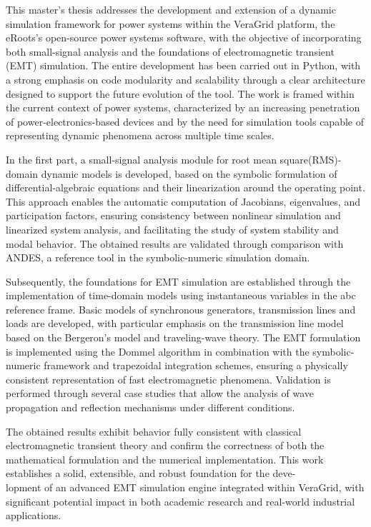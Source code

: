 
This master's thesis addresses the development and extension of a dynamic simulation framework for power systems 
within the VeraGrid platform, the eRoots's open-source power systems software, with the objective of incorporating both small-signal analysis and the foundations of 
electromagnetic transient (EMT) simulation. The entire development has been carried out in Python, with a strong emphasis 
on code modularity and scalability through a clear architecture designed to support the future evolution of the tool. 
The work is framed within the current context of power systems, characterized by an increasing penetration of 
power-electronics-based devices and by the need for simulation tools capable of representing dynamic phenomena across 
multiple time scales.

In the first part, a small-signal analysis module for root mean square(RMS)-domain dynamic models is developed, based on the symbolic 
formulation of differential-algebraic equations and their linearization around the operating point. 
This approach enables the automatic computation of Jacobians, eigenvalues, and participation factors, 
ensuring consistency between nonlinear simulation and linearized system analysis, and facilitating the study of 
system stability and modal behavior. The obtained results are validated through comparison with ANDES, 
a reference tool in the symbolic-numeric simulation domain.

Subsequently, the foundations for EMT simulation are established through the implementation of time-domain models 
using instantaneous variables in the abc reference frame. Basic models of synchronous generators, transmission lines
and loads are developed, with particular emphasis on the transmission line model based on the Bergeron's model and traveling-wave 
theory. The EMT formulation is implemented using the Dommel algorithm in combination with the symbolic-numeric framework 
and trapezoidal integration schemes, ensuring a physically consistent representation of fast electromagnetic phenomena. 
Validation is performed through several case studies that allow the analysis of wave propagation and reflection mechanisms 
under different conditions.

The obtained results exhibit behavior fully consistent with classical electromagnetic transient theory and confirm 
the correctness of both the mathematical formulation and the numerical implementation. 
This work establishes a solid, extensible, and robust foundation for the deve-\\lopment of an advanced EMT simulation engine 
integrated within VeraGrid, with significant potential impact in both academic research and real-world industrial applications.

